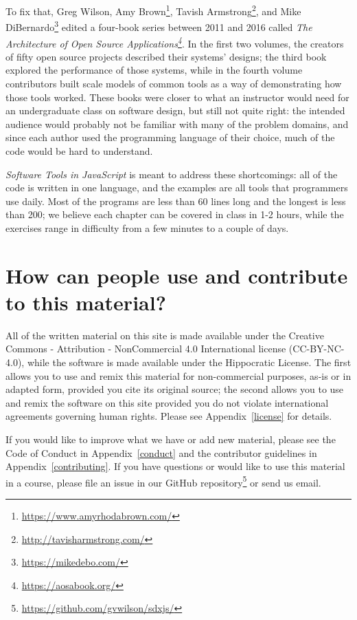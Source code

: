\documentclass[krantzl]{krantz}
\newcommand{\appref}[1]{Appendix~\ref{#1}}
\newcommand{\hreffoot}[2]{{#1}\footnote{\href{#2}{#2}}}
\begin{document}
To fix that,
Greg Wilson, \hreffoot{Amy Brown}{https://www.amyrhodabrown.com/},
\hreffoot{Tavish Armstrong}{http://tavisharmstrong.com/},
and \hreffoot{Mike DiBernardo}{https://mikedebo.com/}
edited a four-book series between 2011 and 2016 called \emph{\hreffoot{The Architecture of Open Source Applications}{https://aosabook.org/}}.
In the first two volumes,
the creators of fifty open source projects described their systems’ designs;
the third book explored the performance of those systems,
while in the fourth volume contributors built scale models of common tools
as a way of demonstrating how those tools worked.
These books were closer to what an instructor would need for an undergraduate class on software design,
but still not quite right:
the intended audience would probably not be familiar with many of the problem domains,
and since each author used the programming language of their choice,
much of the code would be hard to understand.


\emph{Software Tools in JavaScript} is meant to address these shortcomings:
all of the code is written in one language,
and the examples are all tools that programmers use daily.
Most of the programs are less than 60 lines long and the longest is less than 200;
we believe each chapter can be covered in class in 1-2 hours,
while the exercises range in difficulty from a few minutes to a couple of days.

\section{How can people use and contribute to this material?}\label{introduction-use}


All of the written material on this site is made available under the Creative
Commons - Attribution - NonCommercial 4.0 International license (CC-BY-NC-4.0),
while the software is made available under the Hippocratic License.  The first
allows you to use and remix this material for non-commercial purposes, as-is or
in adapted form, provided you cite its original source; the second allows you to
use and remix the software on this site provided you do not violate
international agreements governing human rights. Please see \appref{license}
for details.


If you would like to improve what we have or add new material, please see the
Code of Conduct in \appref{conduct} and the contributor guidelines in
\appref{contributing}.  If you have questions or would like to use this material in
a course, please file an issue in \hreffoot{our GitHub repository}{https://github.com/gvwilson/sdxjs/} or send us email.
\end{document}
